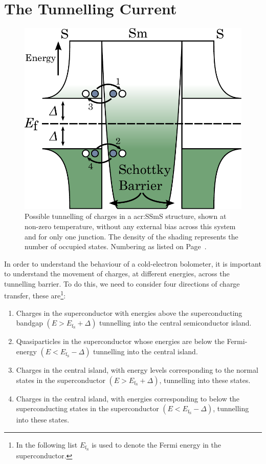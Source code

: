 \section{The Tunnelling Current}\label{sec:theory-current}
\begin{figure}[t]
\begin{center}
\includegraphics[height = 0.5\textheight]{figures/CEB_energyLevels_noBias}
\caption[Possible tunnelling of charges in a SiCEB]{Possible tunnelling of charges in a \gls{acr:SSmS} structure, shown at non-zero temperature,  without any external bias across this system and for only one junction. The density of the shading represents the number of occupied states. Numbering as listed on Page~\pageref{list:tunnellingOptions}.}
\label{fig:IVmod:energyLevels-noBias}
\end{center}
\end{figure}
In order to understand the behaviour of a cold-electron bolometer, it is important to understand the movement of charges, at different energies, across the tunnelling barrier. To do this, we need to consider four directions of charge transfer, these are\footnote{In the following list $E_{\mathrm{f_{S}}}$ is used to denote the Fermi energy in the superconductor.}:
\begin{enumerate}\label{list:tunnellingOptions}
	\item Charges in the superconductor with energies above the superconducting 
			bandgap $\left(E > E_{\mathrm{f_{S}}} + \varDelta\right)$ tunnelling into the 
			central semiconductor island.
	\item Quasiparticles in the 
			superconductor whose energies are below the Fermi-energy 
			$\left(E < E_{\mathrm{f_{S}}} - \varDelta\right)$ tunnelling into the 
			central island. 
	\item Charges in the central island, with energy levels corresponding to the 
			normal states in the superconductor 
			$\left(E > E_{\mathrm{f_{S}}} + \varDelta\right)$, tunnelling into these states.
	\item Charges in the central island, with energies corresponding to below the
			superconducting states in the superconductor 
			$\left(E < E_{\mathrm{f_{S}}} - \varDelta\right)$, tunnelling into these states.
\end{enumerate}
